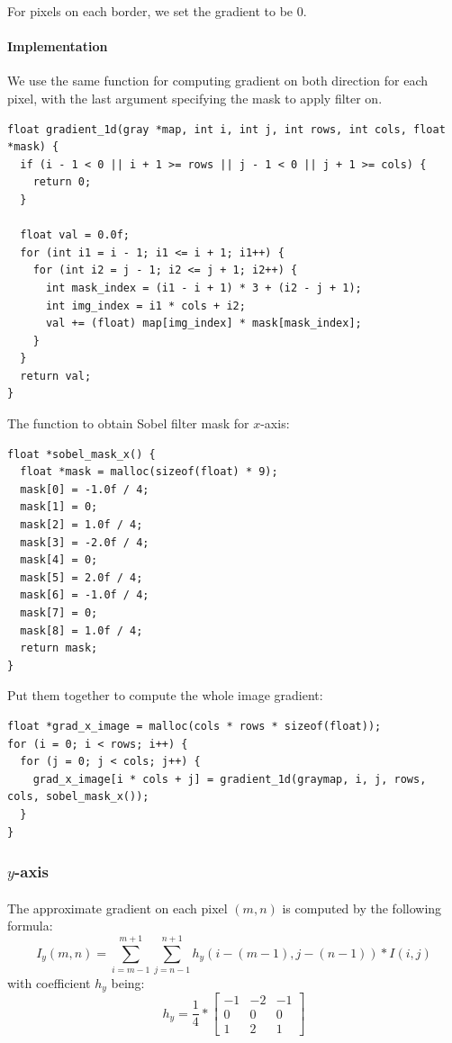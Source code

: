 \documentclass[a4paper, 10pt]{article}
\begin{document}
For pixels on each border, we set the gradient to be $0$.

\paragraph{Implementation}
We use the same function for computing gradient on both direction for each pixel, with the last argument specifying the mask to apply filter on.
\begin{lstlisting}[frame=single]
float gradient_1d(gray *map, int i, int j, int rows, int cols, float *mask) {
  if (i - 1 < 0 || i + 1 >= rows || j - 1 < 0 || j + 1 >= cols) {
    return 0;
  }

  float val = 0.0f;
  for (int i1 = i - 1; i1 <= i + 1; i1++) {
    for (int i2 = j - 1; i2 <= j + 1; i2++) {
      int mask_index = (i1 - i + 1) * 3 + (i2 - j + 1);
      int img_index = i1 * cols + i2;
      val += (float) map[img_index] * mask[mask_index];
    }
  }
  return val;
}
\end{lstlisting}

The function to obtain Sobel filter mask for $x$-axis:
\begin{lstlisting}[frame=single]
float *sobel_mask_x() {
  float *mask = malloc(sizeof(float) * 9);
  mask[0] = -1.0f / 4;
  mask[1] = 0;
  mask[2] = 1.0f / 4;
  mask[3] = -2.0f / 4;
  mask[4] = 0;
  mask[5] = 2.0f / 4;
  mask[6] = -1.0f / 4;
  mask[7] = 0;
  mask[8] = 1.0f / 4;
  return mask;
}
\end{lstlisting}

Put them together to compute the whole image gradient:
\begin{lstlisting}[frame=single]
float *grad_x_image = malloc(cols * rows * sizeof(float));
for (i = 0; i < rows; i++) {
  for (j = 0; j < cols; j++) {
    grad_x_image[i * cols + j] = gradient_1d(graymap, i, j, rows, cols, sobel_mask_x());
  }
}
\end{lstlisting}

\subsubsection{$y$-axis}
\paragraph{} The approximate gradient on each pixel $(m,n)$ is computed by the following formula:
\begin{equation}
I_y(m,n) = \sum_{i=m-1}^{m+1}\sum_{j=n-1}^{n+1}{h_y(i-(m-1),j-(n-1)) * I(i,j)}
\end{equation}
with coefficient $h_y$ being:
\begin{equation}
h_y = \frac{1}{4} * \left[
\begin{matrix}
-1 & -2 & -1 \\
0 & 0 & 0 \\
1 & 2 & 1
\end{matrix}
\right]
\end{equation}
\end{document}
